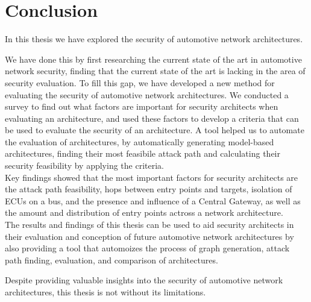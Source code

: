 \chapter{Conclusion}
\label{chp:conclusion}

In this thesis we have explored the security of automotive network architectures.\\\par

We have done this by first researching the current state of the art in automotive network security,
finding that the current state of the art is lacking in the area of security evaluation.
To fill this gap, we have developed a new method for evaluating the security of automotive network architectures.
We conducted a survey to find out what factors are important for security architects when evaluating an architecture,
and used these factors to develop a criteria that can be used to evaluate the security of an architecture.
A tool helped us to automate the evaluation of architectures, by automatically generating model-based architectures,
finding their most feasibile attack path and calculating their security feasibility by applying the criteria.\\

Key findings showed that the most important factors for security architects are the attack path feasibility,
hops between entry points and targets, isolation of ECUs on a bus, and the presence and influence of a Central Gateway,
as well as the amount and distribution of entry points actross a network architecture.\\

The results and findings of this thesis can be used to aid security architects in their evaluation 
and conception of future automotive network architectures by also providing a 
tool that automoizes the process of graph generation, attack path finding, evaluation, and comparison of architectures.\\\par

Despite providing valuable insights into the security of automotive network architectures,
this thesis is not without its limitations.\\

